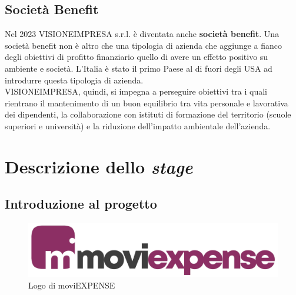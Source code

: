 \subsection{Società Benefit}

Nel 2023 VISIONEIMPRESA s.r.l. è diventata anche \textbf{società benefit}. Una società benefit non è altro che una tipologia di azienda che aggiunge a fianco degli obiettivi di profitto finanziario quello di avere un effetto positivo su ambiente e società. L'Italia è stato il primo Paese al di fuori degli USA ad introdurre questa tipologia di azienda.\\
VISIONEIMPRESA, quindi, si impegna a perseguire obiettivi tra i quali rientrano il mantenimento di un buon equilibrio tra vita personale e lavorativa dei dipendenti, la collaborazione con istituti di formazione del territorio (scuole superiori e università) e la riduzione dell'impatto ambientale dell'azienda.


\section{Descrizione dello \textit{stage}}
\label{cap:descrizione-stage}

\subsection{Introduzione al progetto}

\begin{figure}[!h]
    \centering
    \includegraphics[width=0.5\columnwidth]{images/moviExpense_logo.png}
    \caption{Logo di moviEXPENSE}
\end{figure}

